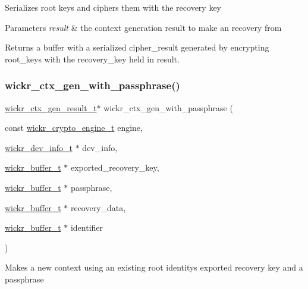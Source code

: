 Serializes root keys and ciphers them with the recovery key


\begin{DoxyParams}{Parameters}
{\em result} & the context generation result to make an recovery from \\
\hline
\end{DoxyParams}
\begin{DoxyReturn}{Returns}
a buffer with a serialized cipher\+\_\+result generated by encrypting \textquotesingle{}root\+\_\+keys\textquotesingle{} with the \textquotesingle{}recovery\+\_\+key\textquotesingle{} held in \textquotesingle{}result\textquotesingle{}. 
\end{DoxyReturn}
\mbox{\label{group__wickr__ctx_gaab0b2731d76d6ea91afd1b147c53a29a}} 
\subsubsection{\texorpdfstring{wickr\+\_\+ctx\+\_\+gen\+\_\+with\+\_\+passphrase()}{wickr\_ctx\_gen\_with\_passphrase()}}
{\footnotesize\ttfamily \hyperlink{structwickr__ctx__gen__result}{wickr\+\_\+ctx\+\_\+gen\+\_\+result\+\_\+t}$\ast$ wickr\+\_\+ctx\+\_\+gen\+\_\+with\+\_\+passphrase (\begin{DoxyParamCaption}\item[{const \hyperlink{structwickr__crypto__engine}{wickr\+\_\+crypto\+\_\+engine\+\_\+t}}]{engine,  }\item[{\hyperlink{structwickr__dev__info}{wickr\+\_\+dev\+\_\+info\+\_\+t} $\ast$}]{dev\+\_\+info,  }\item[{\hyperlink{structwickr__buffer}{wickr\+\_\+buffer\+\_\+t} $\ast$}]{exported\+\_\+recovery\+\_\+key,  }\item[{\hyperlink{structwickr__buffer}{wickr\+\_\+buffer\+\_\+t} $\ast$}]{passphrase,  }\item[{\hyperlink{structwickr__buffer}{wickr\+\_\+buffer\+\_\+t} $\ast$}]{recovery\+\_\+data,  }\item[{\hyperlink{structwickr__buffer}{wickr\+\_\+buffer\+\_\+t} $\ast$}]{identifier }\end{DoxyParamCaption})}

Makes a new context using an existing root identity\textquotesingle{}s exported recovery key and a passphrase

